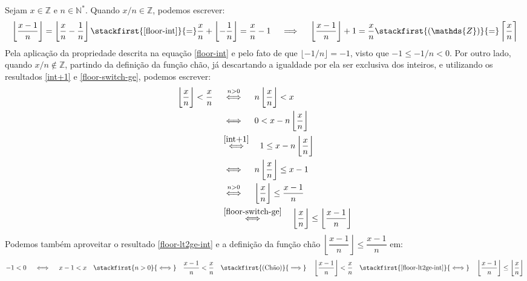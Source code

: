Sejam $x \in \mathds{Z}$ e $n \in \mathds{N}^*$.
Quando $x/n \in \mathds{Z}$, podemos escrever:
\[
    \left\lfloor \dfrac{x - 1}{n} \right\rfloor =
    \left\lfloor \dfrac{x}{n} - \dfrac{1}{n} \right\rfloor
      \stackfirst{\text{\eqref{floor-int}}}{=}
    \dfrac{x}{n} + \left\lfloor - \dfrac{1}{n} \right\rfloor =
    \dfrac{x}{n} - 1
  \quad\implies\quad
    \left\lfloor \dfrac{x - 1}{n} \right\rfloor + 1 =
    \dfrac{x}{n}
      \stackfirst{(\mathds{Z})}{=}
    \left\lceil \dfrac{x\vphantom{l}}{n} \right\rceil
\]
Pela aplicação da propriedade
descrita na equação \eqref{floor-int}
e pelo fato de que $\lfloor -1/n \rfloor = -1$,
visto que $-1 \le -1/n < 0$.
Por outro lado, quando $x/n \notin \mathds{Z}$,
partindo da definição da função chão,
já descartando a igualdade por ela ser exclusiva dos inteiros,
e utilizando os resultados \eqref{int+1} e \eqref{floor-switch-ge},
podemos escrever:
\begin{align*}
    \left\lfloor \dfrac{x\vphantom{l}}{n} \right\rfloor
    < \dfrac{x\vphantom{l}}{n}
  &\quad\stackrel{\rule[-.3em]{0pt}{0pt}n > 0}{\iff}\quad
    n \left\lfloor \dfrac{x\vphantom{l}}{n} \right\rfloor < x
  \\&\quad\iff\quad
    0 < x - n \left\lfloor \dfrac{x\vphantom{l}}{n} \right\rfloor
  \\&\quad\stackrel{\rule[-.3em]{0pt}{0pt}\eqref{int+1}}{\iff}\quad
    1 \le x - n \left\lfloor \dfrac{x\vphantom{l}}{n} \right\rfloor
  \\&\quad\iff\quad
    n \left\lfloor \dfrac{x\vphantom{l}}{n} \right\rfloor \le x - 1
  \\&\quad\stackrel{\rule[-.3em]{0pt}{0pt}n > 0}{\iff}\quad
    \left\lfloor \dfrac{x\vphantom{l}}{n} \right\rfloor
    \le \dfrac{x - 1}{n}
  \\&\quad\stackrel{\rule[-.3em]{0pt}{0pt}\eqref{floor-switch-ge}}{\iff}\quad
    \left\lfloor \dfrac{x\vphantom{l}}{n} \right\rfloor
    \le \left\lfloor \dfrac{x - 1}{n} \right\rfloor
\end{align*}
Podemos também aproveitar o resultado \eqref{floor-lt2ge-int}
e a definição da função chão
$\left\lfloor \dfrac{x - 1}{n} \right\rfloor \le \dfrac{x - 1}{n}$ em:
\[
    -1 < 0
  \quad\iff\quad
    x - 1 < x
  \quad\stackfirst{n > 0}{\iff}\quad
    \dfrac{x - 1}{n} < \dfrac{x}{n}
  \quad\stackfirst{\text{(Chão)}}{\implies}\quad
    \left\lfloor \dfrac{x - 1}{n} \right\rfloor < \dfrac{x}{n}
  \quad\stackfirst{\eqref{floor-lt2ge-int}}{\iff}\quad
    \left\lfloor \dfrac{x - 1}{n} \right\rfloor
    \le \left\lfloor \dfrac{x\vphantom{l}}{n} \right\rfloor
\]
